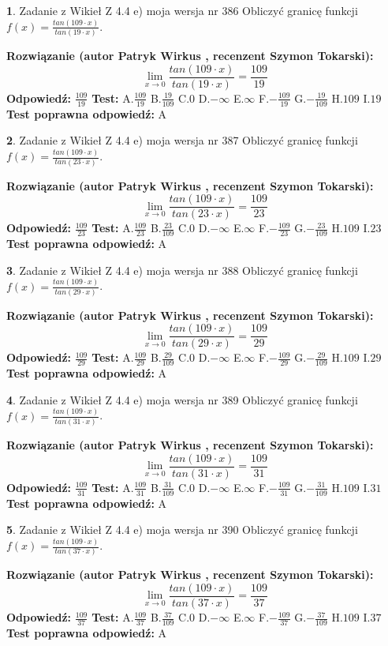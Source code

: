 \documentclass[12pt, a4paper]{article}
\theoremstyle{definition} %
\newtheorem{zad}{}
\newcommand{\zadStart}[1]{\begin{zad}#1\newline}
\newcommand{\zadStop}{\end{zad}}
\newcommand{\rozwStart}[2]{\noindent \textbf{Rozwiązanie (autor #1 , recenzent #2): }\newline}
\newcommand{\rozwStop}{\newline}
\newcommand{\odpStart}{\noindent \textbf{Odpowiedź:}\newline}
\newcommand{\odpStop}{\newline}
\newcommand{\testStart}{\noindent \textbf{Test:}\newline}
\newcommand{\testStop}{\newline}
\newcommand{\kluczStart}{\noindent \textbf{Test poprawna odpowiedź:}\newline}
\newcommand{\kluczStop}{\newline}
\begin{document}
\zadStart{Zadanie z Wikieł Z 4.4 e) moja wersja nr 386}
Obliczyć granicę funkcji $f(x)=\frac{tan(109\cdot x)}{tan(19\cdot x)}$.
\zadStop
\rozwStart{Patryk Wirkus}{Szymon Tokarski}
$$\lim\limits_{x\to 0}\frac{tan(109\cdot x)}{tan(19\cdot x)}=
\frac{109}{19}$$
\rozwStop
\odpStart
$\frac{109}{19}$
\odpStop
\testStart
A.$\frac{109}{19}$
B.$\frac{19}{109}$
C.$0$
D.$-\infty$
E.$\infty$
F.$-\frac{109}{19}$
G.$-\frac{19}{109}$
H.$109$
I.$19$
\testStop
\kluczStart
A
\kluczStop



\zadStart{Zadanie z Wikieł Z 4.4 e) moja wersja nr 387}
Obliczyć granicę funkcji $f(x)=\frac{tan(109\cdot x)}{tan(23\cdot x)}$.
\zadStop
\rozwStart{Patryk Wirkus}{Szymon Tokarski}
$$\lim\limits_{x\to 0}\frac{tan(109\cdot x)}{tan(23\cdot x)}=
\frac{109}{23}$$
\rozwStop
\odpStart
$\frac{109}{23}$
\odpStop
\testStart
A.$\frac{109}{23}$
B.$\frac{23}{109}$
C.$0$
D.$-\infty$
E.$\infty$
F.$-\frac{109}{23}$
G.$-\frac{23}{109}$
H.$109$
I.$23$
\testStop
\kluczStart
A
\kluczStop



\zadStart{Zadanie z Wikieł Z 4.4 e) moja wersja nr 388}
Obliczyć granicę funkcji $f(x)=\frac{tan(109\cdot x)}{tan(29\cdot x)}$.
\zadStop
\rozwStart{Patryk Wirkus}{Szymon Tokarski}
$$\lim\limits_{x\to 0}\frac{tan(109\cdot x)}{tan(29\cdot x)}=
\frac{109}{29}$$
\rozwStop
\odpStart
$\frac{109}{29}$
\odpStop
\testStart
A.$\frac{109}{29}$
B.$\frac{29}{109}$
C.$0$
D.$-\infty$
E.$\infty$
F.$-\frac{109}{29}$
G.$-\frac{29}{109}$
H.$109$
I.$29$
\testStop
\kluczStart
A
\kluczStop



\zadStart{Zadanie z Wikieł Z 4.4 e) moja wersja nr 389}
Obliczyć granicę funkcji $f(x)=\frac{tan(109\cdot x)}{tan(31\cdot x)}$.
\zadStop
\rozwStart{Patryk Wirkus}{Szymon Tokarski}
$$\lim\limits_{x\to 0}\frac{tan(109\cdot x)}{tan(31\cdot x)}=
\frac{109}{31}$$
\rozwStop
\odpStart
$\frac{109}{31}$
\odpStop
\testStart
A.$\frac{109}{31}$
B.$\frac{31}{109}$
C.$0$
D.$-\infty$
E.$\infty$
F.$-\frac{109}{31}$
G.$-\frac{31}{109}$
H.$109$
I.$31$
\testStop
\kluczStart
A
\kluczStop



\zadStart{Zadanie z Wikieł Z 4.4 e) moja wersja nr 390}
Obliczyć granicę funkcji $f(x)=\frac{tan(109\cdot x)}{tan(37\cdot x)}$.
\zadStop
\rozwStart{Patryk Wirkus}{Szymon Tokarski}
$$\lim\limits_{x\to 0}\frac{tan(109\cdot x)}{tan(37\cdot x)}=
\frac{109}{37}$$
\rozwStop
\odpStart
$\frac{109}{37}$
\odpStop
\testStart
A.$\frac{109}{37}$
B.$\frac{37}{109}$
C.$0$
D.$-\infty$
E.$\infty$
F.$-\frac{109}{37}$
G.$-\frac{37}{109}$
H.$109$
I.$37$
\testStop
\kluczStart
A
\kluczStop
\end{document}
